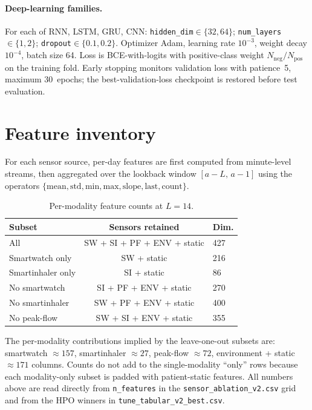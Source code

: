 \documentclass[11pt,a4paper]{article}
\begin{document}
\paragraph{Deep-learning families.}
For each of RNN, LSTM, GRU, CNN:
\texttt{hidden\_dim}$\in\{32,64\}$;
\texttt{num\_layers}$\in\{1,2\}$;
\texttt{dropout}$\in\{0.1,0.2\}$.
Optimizer Adam, learning rate $10^{-3}$, weight decay $10^{-4}$,
batch size 64.  Loss is BCE-with-logits with positive-class weight
$N_{\text{neg}}/N_{\text{pos}}$ on the training fold.  Early
stopping monitors validation loss with patience~5, maximum
30~epochs; the best-validation-loss checkpoint is restored before
test evaluation.

\section{Feature inventory}\label{app:features}

For each sensor source, per-day features are first computed from
minute-level streams, then aggregated over the lookback window
$[a-L,\,a-1]$ using the operators
$\{\text{mean},\text{std},\text{min},\text{max},\text{slope},
\text{last},\text{count}\}$.

\begin{table}[H]
\centering
\caption{Per-modality feature counts at $L=14$.}
\label{tab:features-app}
\small
\begin{tabular}{lcl}
\toprule
\textbf{Subset} & \textbf{Sensors retained} & \textbf{Dim.} \\
\midrule
All               & SW + SI + PF + ENV + static    & 427 \\
Smartwatch only   & SW + static                    & 216 \\
Smartinhaler only & SI + static                    &  86 \\
No smartwatch     & SI + PF + ENV + static         & 270 \\
No smartinhaler   & SW + PF + ENV + static         & 400 \\
No peak-flow      & SW + SI + ENV + static         & 355 \\
\bottomrule
\end{tabular}
\end{table}

The per-modality contributions implied by the leave-one-out
subsets are: smartwatch ${\approx}157$, smartinhaler
${\approx}27$, peak-flow ${\approx}72$, environment + static
${\approx}171$ columns.  Counts do not add to the
single-modality ``only'' rows because each modality-only subset
is padded with patient-static features.  All numbers above are
read directly from \texttt{n\_features} in the
\texttt{sensor\_ablation\_v2.csv} grid and from the HPO winners
in \texttt{tune\_tabular\_v2\_best.csv}.
\end{document}
